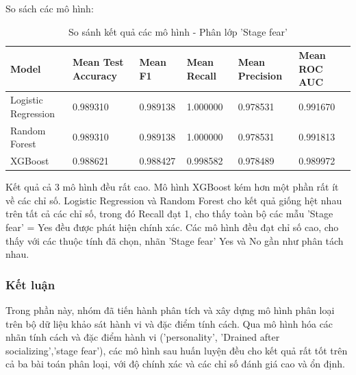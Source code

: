 \begin{itemize}
            \FloatBarrier
    \end{itemize}

    So sách các mô hình:

    \begin{table}[htbp]
        \centering
        \caption{So sánh kết quả các mô hình - Phân lớp 'Stage fear'}
        \label{tab:Behavior-stage-compare}
        \begin{tabular}{|p{2cm}|p{2cm}|p{2cm}|p{2cm}|p{2cm}|p{2cm}|}
        \hline
            Model & Mean Test Accuracy & Mean F1 & Mean Recall & Mean Precision & Mean ROC AUC \\
            \hline
            Logistic Regression & 0.989310 & 0.989138 & 1.000000 & 0.978531 & 0.991670 \\
            \hline
            Random Forest & 0.989310 & 0.989138 & 1.000000 & 0.978531 & 0.991813 \\
            \hline
            XGBoost & 0.988621 & 0.988427 & 0.998582 & 0.978489 & 0.989972 \\
        \hline
        \end{tabular}
    \end{table}

    \FloatBarrier

    Kết quả cả 3 mô hình đều rất cao. Mô hình XGBoost kém hơn một phần rất ít về các chỉ số. Logistic Regression và Random Forest cho kết quả giống hệt nhau trên tất cả các chỉ số, trong đó Recall đạt 1, cho thấy toàn bộ các mẫu 'Stage fear' = Yes đều được phát hiện chính xác. Các mô hình đều đạt chỉ số cao, cho thấy với các thuộc tính đã chọn, nhãn 'Stage fear' Yes và No gần như phân tách nhau.

\subsubsection{Kết luận}
    Trong phần này, nhóm đã tiến hành phân tích và xây dựng mô hình phân loại trên bộ dữ liệu khảo sát hành vi và đặc điểm tính cách. Qua mô hình hóa các nhãn tính cách và đặc điểm hành vi ('personality', 'Drained after socializing','stage fear'), các mô hình sau huấn luyện đều cho kết quả rất tốt trên cả ba bài toán phân loại, với độ chính xác và các chỉ số đánh giá cao và ổn định. 
